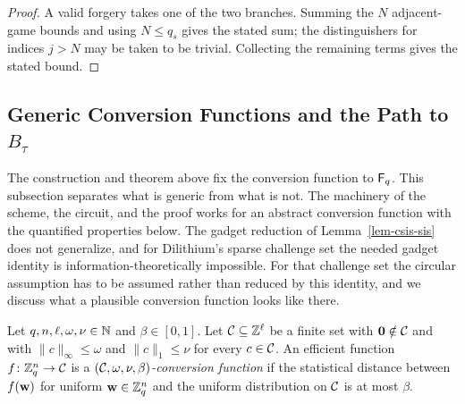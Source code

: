 \begin{proof}
 A valid forgery takes one of the two branches. Summing the $N$ adjacent-game bounds and using $N\le q_s$ gives the stated sum; the distinguishers for indices $j>N$ may be taken to be trivial. Collecting the remaining terms gives the stated bound.
\end{proof}


\subsection{Generic Conversion Functions and the Path to $B_\tau$} \label{sec-dil-generic}

The construction and theorem above fix the conversion function to $\mathsf{F}_q$. This subsection separates what is generic from what is not. The machinery of the scheme, the circuit, and the proof works for an abstract conversion function with the quantified properties below. The gadget reduction of Lemma~\ref{lem-csis-sis} does not generalize, and for Dilithium's sparse challenge set the needed gadget identity is information-theoretically impossible. For that challenge set the circular assumption has to be assumed rather than reduced by this identity, and we discuss what a plausible conversion function looks like there.

\begin{definition} \label{def-convfun}
Let $q, n, \ell, \omega, \nu \in \mathbb N$ and $\beta \in [0,1]$. Let $\mathcal{C} \subseteq \mathbb Z^{\ell}$ be a finite set with $\mathbf{0} \notin \mathcal{C}$ and with $\|c\|_\infty \le \omega$ and $\|c\|_1 \le \nu$ for every $c \in \mathcal{C}$. An efficient function $f \colon \mathbb{Z}_q^n \to \mathcal{C}$ is a \emph{$(\mathcal{C}, \omega, \nu, \beta)$-conversion function} if the statistical distance between $f(\mathbf{w})$ for uniform $\mathbf{w} \in \mathbb{Z}_q^n$ and the uniform distribution on $\mathcal{C}$ is at most $\beta$.
\end{definition}

